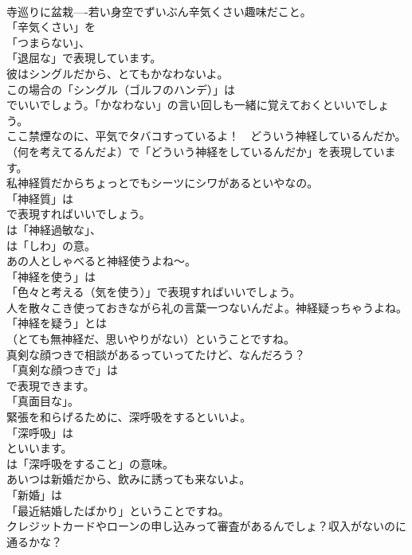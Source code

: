 \documentclass[8pt]{extreport}
\begin{document}
\begin{CJK}{UTF8}{min}
\\	寺巡りに盆栽----若い身空でずいぶん辛気くさい趣味だこと。 
\\	「辛気くさい」を
\\	「つまらない」、
\\	「退屈な」で表現しています。	
\\	彼はシングルだから、とてもかなわないよ。 
\\	この場合の「シングル（ゴルフのハンデ）」は
\\	でいいでしょう。「かなわない」の言い回しも一緒に覚えておくといいでしょう。	
\\	ここ禁煙なのに、平気でタバコすっているよ！　どういう神経しているんだか。 
\\	（何を考えてるんだよ）で「どういう神経をしているんだか」を表現しています。	
\\	私神経質だからちょっとでもシーツにシワがあるといやなの。 
\\	「神経質」は 
\\	で表現すればいいでしょう。
\\	は「神経過敏な」、
\\	は「しわ」の意。	
\\	あの人としゃべると神経使うよね～。 
\\	「神経を使う」は
\\	「色々と考える（気を使う）」で表現すればいいでしょう。	
\\	人を散々こき使っておきながら礼の言葉一つないんだよ。神経疑っちゃうよね。 
\\	「神経を疑う」とは 
\\	（とても無神経だ、思いやりがない）ということですね。	
\\	真剣な顔つきで相談があるっていってたけど、なんだろう？ 
\\	「真剣な顔つきで」は
\\	で表現できます。
\\	「真面目な」。	
\\	緊張を和らげるために、深呼吸をするといいよ。 
\\	「深呼吸」は 
\\	といいます。
\\	は「深呼吸をすること」の意味。	
\\	あいつは新婚だから、飲みに誘っても来ないよ。 
\\	「新婚」は
\\	「最近結婚したばかり」ということですね。	
\\	クレジットカードやローンの申し込みって審査があるんでしょ？収入がないのに通るかな？ 

\end{CJK}
\end{document}
